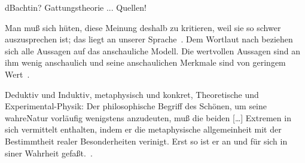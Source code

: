 dBachtin? Gattungstheorie ...
Quellen!

\glqq Man muß sich hüten, diese Meinung deshalb zu kritieren, weil sie so
  schwer auszusprechen ist; das liegt an unserer Sprache\grqq\
  \citep{Schroedinger1935}. 
\glqq Dem Wortlaut nach beziehen sich alle Aussagen auf das anschauliche
  Modell. Die wertvollen Aussagen sind an ihm wenig anschaulich und seine
  anschaulichen Merkmale sind von geringem Wert\grqq\ \citep{Schroedinger1935}.

Deduktiv und Induktiv, metaphysisch und konkret, Theoretische und
  Experimental-Physik: \glqq Der philosophische Begriff des Schönen, um seine
  wahreNatur vorläufig wenigstens anzudeuten, muß die beiden [\ldots] Extremen
  in sich vermittelt enthalten, indem er die metaphysische 
  allgemeinheit mit der Bestimmtheit realer Besonderheiten verinigt. Erst so ist
  er an und für sich in siner Wahrheit gefaßt.\grqq\ \citep[S. 39]{Hegel1986}.


